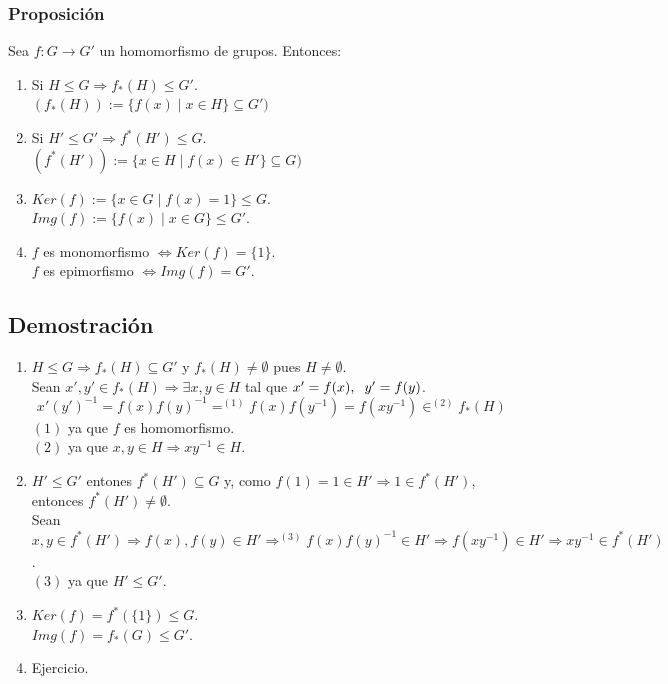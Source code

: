 \documentclass[11pt,a4paper]{article}
\begin{document}
\subsubsection*{Proposición}

Sea $f: G \to G'$ un homomorfismo de grupos. Entonces:
\begin{enumerate}[label=\roman*)]
\item Si $H \leqslant G \Rightarrow f_{*}(H) \leqslant G'$. \\
$(f_{*}(H)) := \{ f(x) \mid x \in H \} \subseteq G')$
\item Si $H' \leqslant G' \Rightarrow f^{*}(H') \leqslant G$. \\
$(f^{*}(H')) := \{x \in H \mid f(x) \in H' \} \subseteq G)$
\item $Ker(f) := \{ x \in G \mid f(x) = 1 \} \leqslant G$. \\
$Img(f) := \{ f(x) \mid x \in G \} \leqslant G'$.
\item $f$ es monomorfismo $\iff Ker(f) = \{ 1 \}$. \\
$f$ es epimorfismo $\iff Img(f) = G'$.
\end{enumerate}
 
\subsection*{Demostración}

\begin{enumerate}[label=\roman*)]
\item $H \leqslant G \Rightarrow f_{*} (H) \subseteq G'$ y $f_{*}(H) \neq \emptyset$ pues $H \neq \emptyset$. \\
Sean $x', y' \in f_{*}(H) \Rightarrow \exists x, y \in H$ tal que $x' = f(x), \hspace{0.2cm} y' = f(y)$.
$$x'(y')^{-1} = f(x) f(y)^{-1} =^{(1)} f(x) f(y^{-1}) = f(xy^{-1}) \in^{(2)} f_{*}(H)$$
$(1)$ ya que $f$ es homomorfismo. \\
$(2)$ ya que $x, y \in H \Rightarrow xy^{-1} \in H$.
\item $H' \leqslant G'$ entones $f^{*}(H') \subseteq G$ y, como $f(1) = 1 \in H' \Rightarrow 1 \in f^{*}(H')$, entonces $f^{*}(H') \neq \emptyset$. \\
Sean $x, y \in f^{*}(H') \Rightarrow f(x), f(y) \in H' \Rightarrow^{(3)} f(x)f(y)^{-1} \in H' \Rightarrow f(xy^{-1}) \in H' \Rightarrow xy^{-1} \in f^{*}(H')$. \\
$(3)$ ya que $H' \leqslant G'$.
\item $Ker(f) = f^{*}(\{1\}) \leqslant G$. \\
$Img(f) = f_{*}(G) \leqslant G'$.
\item Ejercicio.
\end{enumerate} 
\end{document}

